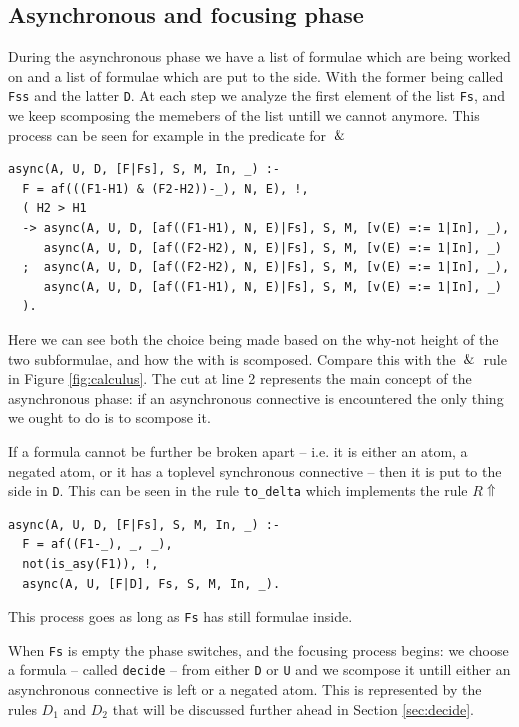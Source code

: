 \documentclass[a4paper, 12pt, tesi, english]{report}
\begin{document}
\subsection{Asynchronous and focusing phase}
During the asynchronous phase we have a list of formulae which are being worked on and a list of formulae which are put to the side.
With the former being called \texttt{Fss} and the latter \texttt{D}.
At each step we analyze the first element of the list \texttt{Fs}, and we keep scomposing the memebers of the list untill we cannot anymore.
This process can be seen for example in the predicate for $\:\&\:$
\begin{verbatim}
async(A, U, D, [F|Fs], S, M, In, _) :-
  F = af(((F1-H1) & (F2-H2))-_), N, E), !,
  ( H2 > H1	
  -> async(A, U, D, [af((F1-H1), N, E)|Fs], S, M, [v(E) =:= 1|In], _), 
     async(A, U, D, [af((F2-H2), N, E)|Fs], S, M, [v(E) =:= 1|In], _) 
  ;  async(A, U, D, [af((F2-H2), N, E)|Fs], S, M, [v(E) =:= 1|In], _),
     async(A, U, D, [af((F1-H1), N, E)|Fs], S, M, [v(E) =:= 1|In], _)
  ).
\end{verbatim}
Here we can see both the choice being made based on the why-not height of the two subformulae, and how the with is scomposed.
Compare this with the $\:\&\:$ rule in Figure \ref{fig:calculus}.
The cut at line 2 represents the main concept of the asynchronous phase: if an asynchronous connective is encountered the only thing we ought to do is to scompose it.

If a formula cannot be further be broken apart -- i.e. it is either an atom, a negated atom, or it has a toplevel synchronous connective -- then it is put to the side in \texttt{D}.
This can be seen in the rule \texttt{to\_delta} which implements the rule $R\!\Uparrow$
\begin{verbatim}
async(A, U, D, [F|Fs], S, M, In, _) :-
  F = af((F1-_), _, _),
  not(is_asy(F1)), !,
  async(A, U, [F|D], Fs, S, M, In, _).
\end{verbatim}
This process goes as long as \texttt{Fs} has still formulae inside.

When \texttt{Fs} is empty the phase switches, and the focusing process begins: we choose a formula -- called \texttt{decide} -- from either \texttt{D} or \texttt{U} and we scompose it untill either an asynchronous connective is left or a negated atom.
This is represented by the rules $D_1$ and $D_2$ that will be discussed further ahead in Section \ref{sec:decide}.
\end{document}

